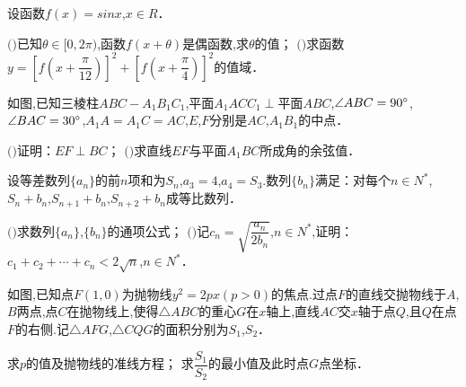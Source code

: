 \question[14] 设函数$f(x)=sinx$,$x \in R$．
\begin{subquestions}
    \subquestion $($$)$已知$ \theta  \in [0 , 2 \pi )$,函数$f(x+ \theta )$是偶函数,求$ \theta $的值；
    \subquestion $($$)$求函数$y=[f(x+ \dfrac { \pi }{12} )] ^{2} +[f(x+ \dfrac { \pi }{4} )] ^{2}$的值域．
\end{subquestions}
\begin{solution}{6cm}

\end{solution}



\question[15] 如图,已知三棱柱$ABC-A _{1} B _{1} C _{1}$,平面$A _{1} ACC _{1}  \perp $平面$ABC$,$ \angle ABC=90^{\small \circ}$,$ \angle BAC=30^{\small \circ}$,$A _{1} A=A _{1} C=AC$,$E$,$F$分别是$AC$,$A _{1} B _{1}$的中点．
\begin{subquestions}
    \subquestion $($$)$证明：$EF \perp BC$；
    \subquestion $($$)$求直线$EF$与平面$A _{1} BC$所成角的余弦值．
\end{subquestions}

\begin{solution}{6cm}

\end{solution}



\question[15] 设等差数列$\{a _{n} \}$的前$n$项和为$S _{n}$,$a _{3} =4$,$a _{4} =S _{3} .$数列$\{b _{n} \}$满足：对每个$n \in N ^{*}$,$S _{n} +b _{n}$,$S _{n+1} +b _{n}$,$S _{n+2} +b _{n}$成等比数列．
\begin{subquestions}
    \subquestion $($$)$求数列$\{a _{n} \}$,$\{b _{n} \}$的通项公式；
    \subquestion $($$)$记$c _{n} = \sqrt { \dfrac {a_{n}}{2b_{n}}}$,$n \in N ^{*}$,证明：$c _{1} +c _{2} + \cdots +c _{n}  \lt  2 \sqrt {n}$,$n \in N ^{*}$．
\end{subquestions}
\begin{solution}{6cm}

\end{solution}



\question[12] 如图,已知点$F(1 , 0)$为抛物线$y ^{2} =2px(p  \gt  0)$的焦点$.$过点$F$的直线交抛物线于$A$,$B$两点,点$C$在抛物线上,使得$\triangle ABC$的重心$G$在$x$轴上,直线$AC$交$x$轴于点$Q$,且$Q$在点$F$的右侧$.$记$\triangle AFG$,$\triangle CQG$的面积分别为$S _{1}$,$S _{2}$．
\begin{subquestions}
    \subquestion 求$p$的值及抛物线的准线方程；
    \subquestion 求$ \dfrac {S_{1}}{S_{2}}$的最小值及此时点$G$点坐标．
\end{subquestions}

